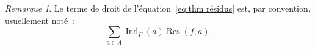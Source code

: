 \documentclass{report}
\theoremstyle{definition}
\theoremstyle{remark}
\newtheorem*{rmq}{Remarque}
\numberwithin{equation}{section}
\DeclareMathOperator{\Ind}{Ind}
\DeclareMathOperator{\Res}{Res}
\begin{document}
			\begin{rmq} Le terme de droit de l'équation~\eqref{eq:thm résidus} est, par convention, usuellement noté~:
			\begin{equation}
				\sum_{a \in A}\Ind_\Gamma(a)\Res(f, a).
			\end{equation}
			\end{rmq}
\end{document}
